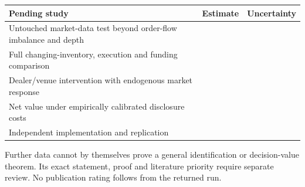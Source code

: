 \begin{center}\small
\begin{tabular}{p{}cc}
\toprule
Pending study & Estimate & Uncertainty\\
\midrule
Untouched market-data test beyond order-flow imbalance and depth & & \\[1.8ex]
Full changing-inventory, execution and funding comparison & & \\[1.8ex]
Dealer/venue intervention with endogenous market response & & \\[1.8ex]
Net value under empirically calibrated disclosure costs & & \\[1.8ex]
Independent implementation and replication & & \\[1.8ex]
\bottomrule
\end{tabular}
\end{center}
\noindent Further data cannot by themselves prove a general identification or
decision-value theorem. Its exact statement, proof and literature priority
require separate review. No publication rating follows from the returned run.
